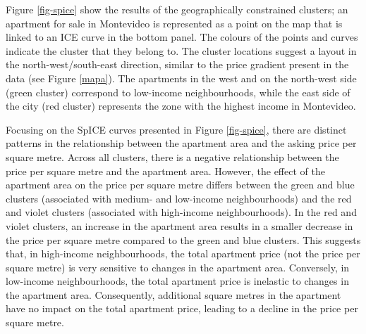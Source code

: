 \documentclass[smallextended,natbib]{svjour3}\usepackage[]{graphicx}\usepackage[]{xcolor}
\newcommand{\1}[1]{\mathbbm{1}_{#1}}
\begin{document}
Figure \ref{fig-spice} show the results of the geographically constrained clusters; an apartment for sale in Montevideo is represented as a point on the map that is linked to an ICE curve in the bottom panel. The colours of the points and curves indicate the cluster that they belong to. The cluster locations suggest a layout in the north-west/south-east direction, similar to the price gradient present in the data (see Figure \ref{mapa}). The apartments in the west and on the north-west side (green cluster) correspond to low-income neighbourhoods, while the east side of the city (red cluster) represents the zone with the highest income in Montevideo. 

Focusing on the SpICE curves presented in Figure \ref{fig-spice}, there are distinct patterns in the relationship between the apartment area and the asking price per square metre. Across all clusters, there is a negative relationship between the price per square metre and the apartment area. However, the effect of the apartment area on the price per square metre differs between the green and blue clusters (associated with medium- and low-income neighbourhoods) and the red and violet clusters (associated with high-income neighbourhoods). In the red and violet clusters, an increase in the apartment area results in a smaller decrease in the price per square metre compared to the green and blue clusters. This suggests that, in high-income neighbourhoods, the total apartment price (not the price per square metre) is very sensitive to changes in the apartment area. Conversely, in low-income neighbourhoods, the total apartment price is inelastic to changes in the apartment area. Consequently, additional square metres in the apartment have no impact on the total apartment price, leading to a decline in the price per square metre. %
\end{document}
